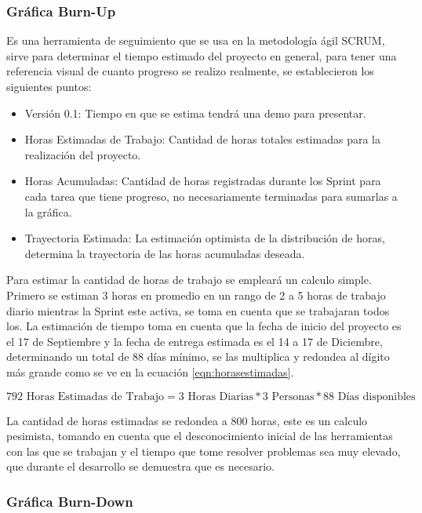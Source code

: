 \subsubsection{Gráfica Burn-Up}

Es una herramienta de seguimiento que se usa en la metodología ágil SCRUM, sirve para determinar el tiempo estimado del proyecto en general, para tener una referencia visual de cuanto progreso se realizo realmente, se establecieron los siguientes puntos:

\begin{itemize}
	\item Versión 0.1: Tiempo en que se estima tendrá una demo para presentar.
	\item Horas Estimadas de Trabajo: Cantidad de horas totales estimadas para la realización del proyecto.
	\item Horas Acumuladas: Cantidad de horas registradas durante los Sprint para cada tarea que tiene progreso, no necesariamente terminadas para sumarlas a la gráfica. 
	\item Trayectoria Estimada: La estimación optimista de la distribución de horas, determina la trayectoria de las horas acumuladas deseada.
\end{itemize}

Para estimar la cantidad de horas de trabajo se empleará un calculo simple.
 Primero se estiman 3 horas en promedio en un rango de 2 a 5 horas de trabajo diario mientras la Sprint este activa, se toma en cuenta que se trabajaran todos los. La estimación de tiempo toma en cuenta que la fecha de inicio del proyecto es el 17 de Septiembre y la fecha de entrega estimada es el 14 a 17 de Diciembre, determinando un total de 88 días mínimo, se las multiplica y redondea al dígito más grande como se ve en la ecuación \ref{eqn:horasestimadas}.
 
\begin{equation} 
\label{eqn:horasestimadas} 
	792 \text{ Horas Estimadas de Trabajo} = 3 \text{ Horas Diarias} * 3 \text{ Personas} * 88 \text{ Días disponibles}	
\end{equation}

La cantidad de horas estimadas se redondea a 800 horas, este es un calculo pesimista, tomando en cuenta que el desconocimiento inicial de las herramientas con las que se trabajan y el tiempo que tome resolver problemas sea muy elevado, que durante el desarrollo se demuestra que es necesario.

\subsubsection{Gráfica Burn-Down}

